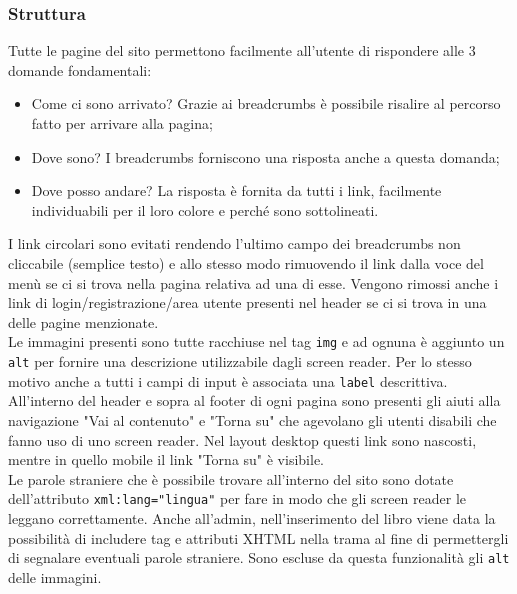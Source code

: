 \documentclass[12pt,a4paper,headings=optiontohead]{article}
\begin{document}
	\subsubsection{Struttura}
	Tutte le pagine del sito permettono facilmente all'utente di rispondere alle 3 domande fondamentali:
	\begin{itemize}
		\item Come ci sono arrivato? Grazie ai breadcrumbs è possibile risalire al percorso fatto per arrivare alla pagina;
		\item Dove sono? I breadcrumbs forniscono una risposta anche a questa domanda;
		\item Dove posso andare? La risposta è fornita da tutti i link, facilmente individuabili per il loro colore e perché sono sottolineati.
	\end{itemize} 
	I link circolari sono evitati rendendo l'ultimo campo dei breadcrumbs non cliccabile (semplice testo) e allo stesso modo rimuovendo il link dalla voce del menù se ci si trova nella pagina relativa ad una di esse. Vengono rimossi anche i link di login/registrazione/area utente presenti nel header se ci si trova in una delle pagine menzionate.  \\
	Le immagini presenti sono tutte racchiuse nel tag \texttt{img} e ad ognuna è aggiunto un \texttt{alt} per fornire una descrizione utilizzabile dagli screen reader. Per lo stesso motivo anche a tutti i campi di input è associata una \texttt{label} descrittiva. \\
	All'interno del header e sopra al footer di ogni pagina sono presenti gli aiuti alla navigazione "Vai al contenuto" e "Torna su" che agevolano gli utenti disabili che fanno uso di uno screen reader. Nel layout desktop questi link sono nascosti, mentre in quello mobile il link "Torna su" è visibile.\\
	Le parole straniere che è possibile trovare all'interno del sito sono dotate dell'attributo \texttt{xml:lang="lingua"} per fare in modo che gli screen reader le leggano correttamente. Anche all'admin, nell'inserimento del libro viene data la possibilità di includere tag e attributi XHTML nella trama al fine di permettergli di segnalare eventuali parole straniere. Sono escluse da questa funzionalità gli \texttt{alt} delle immagini.
	
\end{document}
